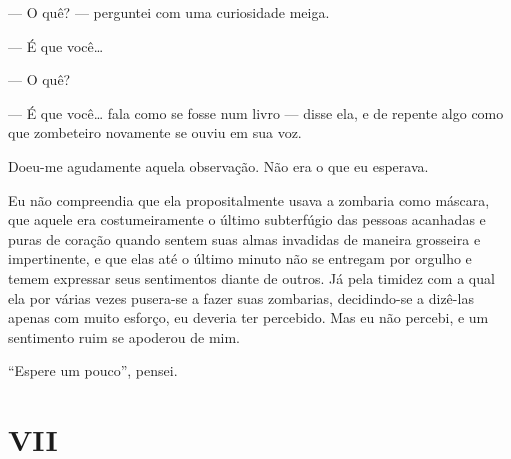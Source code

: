 --- O quê? --- perguntei com uma curiosidade meiga.

--- É que você\ldots{}

--- O quê?

--- É que você\ldots{} fala como se fosse num livro --- disse ela, e de repente
algo como que zombeteiro novamente se ouviu em sua voz.

Doeu-me agudamente aquela observação. Não era o que eu esperava.
 

Eu não compreendia que ela propositalmente usava a zombaria como
máscara, que aquele era costumeiramente o último subterfúgio das
pessoas acanhadas e puras de coração quando sentem suas almas invadidas
de maneira grosseira e impertinente, e que elas até o último minuto não
se entregam por orgulho e temem expressar seus sentimentos diante de
outros. Já pela timidez com a qual ela por várias vezes pusera-se a
fazer suas zombarias, decidindo-se a dizê-las apenas com muito esforço,
eu deveria ter percebido. Mas eu não percebi, e um sentimento ruim se
apoderou de mim.

“Espere um pouco”, pensei.


\section{VII}

